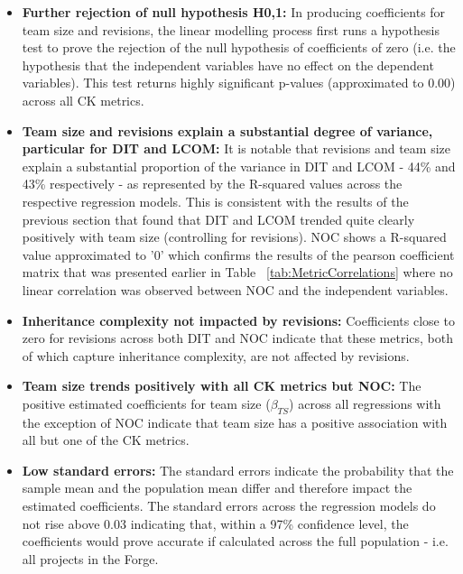 \begin{itemize}
\item  \textbf{Further rejection of null hypothesis H0,1:} In producing coefficients for team size and revisions, the linear modelling process first runs a hypothesis test to prove the rejection of the null hypothesis of coefficients of zero (i.e. the hypothesis that the independent variables have no effect on the dependent variables). This test returns highly significant p-values (approximated to 0.00) across all CK metrics.

\item  \textbf{Team size and revisions explain a substantial degree of variance, particular for DIT and LCOM:} It is notable that revisions and team size explain a substantial proportion of the variance in DIT and LCOM - 44\% and 43\% respectively - as represented by the R-squared values across the respective regression models. This is consistent with the results of the previous section that found that DIT and LCOM trended quite clearly positively with team size (controlling for revisions). NOC shows a R-squared value approximated to '0' which confirms the results of the pearson coefficient matrix that was presented earlier in Table ~\ref{tab:MetricCorrelations} where no linear correlation was observed between NOC and the independent variables.

\item  \textbf{Inheritance complexity not impacted by revisions:} Coefficients close to zero for revisions across both DIT and NOC indicate that these metrics, both of which capture inheritance complexity, are not affected by revisions.

\item  \textbf{Team size trends positively with all CK metrics but NOC:} The positive estimated coefficients for team size ($\beta_{TS}$) across all regressions with the exception of NOC indicate that team size has a positive association with all but one of the CK metrics.

\item  \textbf{Low standard errors:} The standard errors indicate the probability that the sample mean and the population mean differ and therefore impact the estimated coefficients. The standard errors across the regression models do not rise above 0.03 indicating that, within a 97\% confidence level, the coefficients would prove accurate if calculated across the full population - i.e. all projects in the Forge.

\end{itemize}

